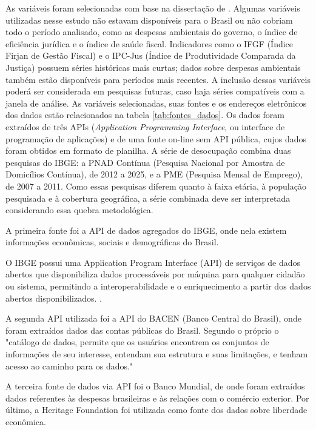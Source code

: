 As variáveis foram selecionadas com base na dissertação de . Algumas variáveis utilizadas nesse estudo não estavam disponíveis para o Brasil ou não cobriam todo o período analisado, como as despesas ambientais do governo, o índice de eficiência jurídica e o índice de saúde fiscal. Indicadores como o IFGF (Índice Firjan de Gestão Fiscal) e o IPC-Jus (Índice de Produtividade Comparada da Justiça) possuem séries históricas mais curtas; dados sobre despesas ambientais também estão disponíveis para períodos mais recentes. A inclusão dessas variáveis poderá ser considerada em pesquisas futuras, caso haja séries compatíveis com a janela de análise. As variáveis selecionadas, suas fontes e os endereços eletrônicos dos dados estão relacionados na tabela \ref{tab:fontes_dados}. Os dados foram extraídos de três APIs (\textit{Application Programming Interface}, ou interface de programação de aplicações) e de uma fonte on-line sem API pública, cujos dados foram obtidos em formato de planilha. A série de desocupação combina duas pesquisas do IBGE: a PNAD Contínua (Pesquisa Nacional por Amostra de Domicílios Contínua), de 2012 a 2025, e a PME (Pesquisa Mensal de Emprego), de 2007 a 2011. Como essas pesquisas diferem quanto à faixa etária, à população pesquisada e à cobertura geográfica, a série combinada deve ser interpretada considerando essa quebra metodológica.

A primeira fonte foi a API de dados agregados do IBGE, onde nela existem informações econômicas, sociais e demográficas do Brasil. 


\begin{citacao}
	O IBGE possui uma Application Program Interface (API) de serviços de dados abertos que disponibiliza dados processáveis por máquina para qualquer cidadão ou sistema, permitindo a interoperabilidade e o enriquecimento a partir dos dados abertos disponibilizados. .
\end{citacao}

A segunda API utilizada foi a API do BACEN (Banco Central do Brasil), onde foram extraídos dados das contas públicas do Brasil. Segundo o próprio  o "catálogo de dados, permite que os usuários encontrem os conjuntos de informações de seu interesse, entendam sua estrutura e suas limitações, e tenham acesso ao caminho para os dados."

A terceira fonte de dados via API foi o Banco Mundial, de onde foram extraídos dados referentes às despesas brasileiras e às relações com o comércio exterior. Por último, a Heritage Foundation foi utilizada como fonte dos dados sobre liberdade econômica.

